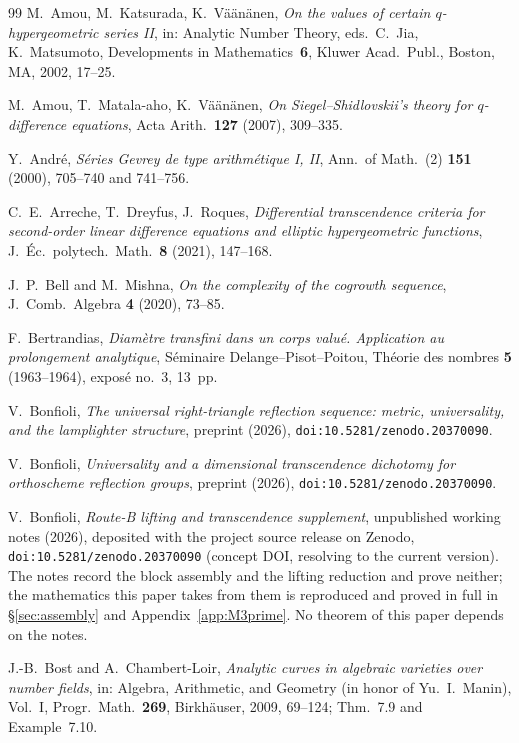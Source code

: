 \documentclass[11pt]{article}
\theoremstyle{plain}
\theoremstyle{definition}
\theoremstyle{remark}
\begin{document}
\begin{thebibliography}{99}
 M.~Amou, M.~Katsurada, K.~V\"a\"an\"anen, \emph{On the values of certain
$q$-hypergeometric series II}, in: Analytic Number Theory, eds.\ C.~Jia, K.~Matsumoto,
Developments in Mathematics~\textbf{6}, Kluwer Acad.\ Publ., Boston, MA, 2002, 17--25.

 M.~Amou, T.~Matala-aho, K.~V\"a\"an\"anen, \emph{On Siegel--Shidlovskii's theory
for $q$-difference equations}, Acta Arith.\ \textbf{127} (2007), 309--335.

 Y.~Andr\'e, \emph{S\'eries Gevrey de type arithm\'etique I, II}, Ann.\ of Math.\
(2) \textbf{151} (2000), 705--740 and 741--756.

 C.~E.~Arreche, T.~Dreyfus, J.~Roques, \emph{Differential transcendence criteria
for second-order linear difference equations and elliptic hypergeometric functions},
J.~\'Ec.\ polytech.\ Math.\ \textbf{8} (2021), 147--168.

 J.~P.~Bell and M.~Mishna, \emph{On the complexity of the cogrowth
sequence}, J.~Comb.\ Algebra \textbf{4} (2020), 73--85.

 F.~Bertrandias, \emph{Diam\`etre transfini dans un corps valu\'e.
Application au prolongement analytique}, S\'eminaire Delange--Pisot--Poitou, Th\'eorie des
nombres \textbf{5} (1963--1964), expos\'e no.~3, 13~pp.

 V.~Bonfioli, \emph{The universal right-triangle reflection sequence:
metric, universality, and the lamplighter structure}, preprint (2026),
\texttt{doi:10.5281/zenodo.20370090}.

 V.~Bonfioli, \emph{Universality and a dimensional transcendence dichotomy
for orthoscheme reflection groups}, preprint (2026), \texttt{doi:10.5281/zenodo.20370090}.

 V.~Bonfioli, \emph{Route-B lifting and transcendence supplement}, unpublished
working notes (2026), deposited with the project source release on Zenodo,
\texttt{doi:10.5281/zenodo.20370090} (concept DOI, resolving to the current version). The notes
record the block assembly and the lifting reduction and prove neither; the mathematics this paper
takes from them is reproduced and proved in full in \S\ref{sec:assembly} and
Appendix~\ref{app:M3prime}. No
theorem of this paper depends on the notes.

 J.-B.~Bost and A.~Chambert-Loir, \emph{Analytic curves in algebraic
varieties over number fields}, in: Algebra, Arithmetic, and Geometry (in honor of Yu.~I.~Manin),
Vol.~I, Progr.\ Math.~\textbf{269}, Birkh\"auser, 2009, 69--124; Thm.~7.9 and Example~7.10.


\end{thebibliography}
\end{document}
